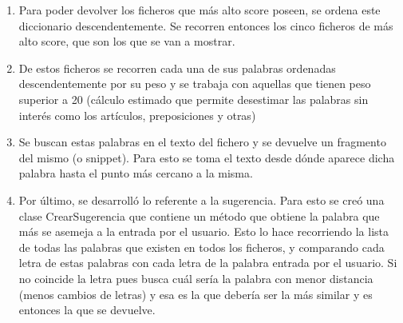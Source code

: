 \documentclass[spanish,10pt,a4paper]{article}
\begin{document}
\begin{enumerate}
		\item Para poder devolver los ficheros que más alto score poseen, se ordena este diccionario descendentemente. Se recorren entonces los cinco ficheros de más alto score, que son los que se van a mostrar.
		
		\item De estos ficheros se recorren cada una de sus palabras ordenadas descendentemente por su peso y se trabaja con aquellas que tienen peso superior a 20 (cálculo estimado que permite desestimar las palabras sin interés como los artículos, preposiciones y otras)
		
		\item Se buscan estas palabras en el texto del fichero y se devuelve un fragmento del mismo (o snippet). Para esto se toma el texto desde dónde aparece dicha palabra hasta el punto más cercano a la misma.
		
		\item Por último, se desarrolló lo referente a la sugerencia. Para esto se creó una clase CrearSugerencia que contiene un método que obtiene la palabra que más se asemeja a la entrada por el usuario. 
		Esto lo hace recorriendo la lista de todas las palabras que existen en todos los ficheros, y comparando cada letra de estas palabras con cada letra de la palabra entrada por el usuario. Si no coincide la letra pues busca cuál sería la palabra con menor distancia (menos cambios de letras) y esa es la que debería ser la más similar y es entonces la que se devuelve.
	\end{enumerate}
	
\end{document}
